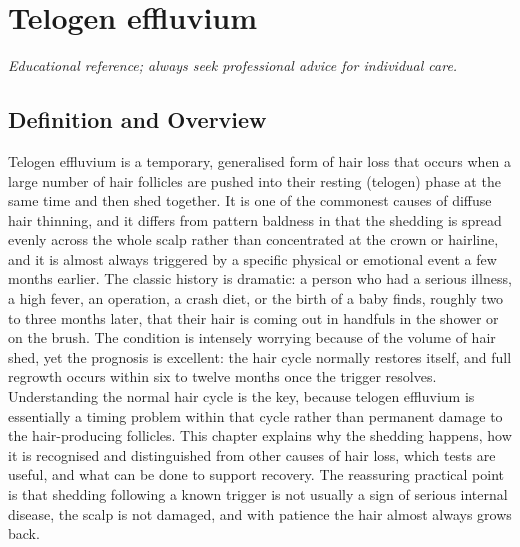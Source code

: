 \chapter{Telogen effluvium}

\medskip
\noindent\textit{Educational reference; always seek professional advice for individual care.}

\section*{Definition and Overview}
Telogen effluvium is a temporary, generalised form of hair loss that occurs when a large number of hair follicles are pushed into their resting (telogen) phase at the same time and then shed together. It is one of the commonest causes of diffuse hair thinning, and it differs from pattern baldness in that the shedding is spread evenly across the whole scalp rather than concentrated at the crown or hairline, and it is almost always triggered by a specific physical or emotional event a few months earlier. The classic history is dramatic: a person who had a serious illness, a high fever, an operation, a crash diet, or the birth of a baby finds, roughly two to three months later, that their hair is coming out in handfuls in the shower or on the brush. The condition is intensely worrying because of the volume of hair shed, yet the prognosis is excellent: the hair cycle normally restores itself, and full regrowth occurs within six to twelve months once the trigger resolves. Understanding the normal hair cycle is the key, because telogen effluvium is essentially a timing problem within that cycle rather than permanent damage to the hair-producing follicles. This chapter explains why the shedding happens, how it is recognised and distinguished from other causes of hair loss, which tests are useful, and what can be done to support recovery. The reassuring practical point is that shedding following a known trigger is not usually a sign of serious internal disease, the scalp is not damaged, and with patience the hair almost always grows back.

